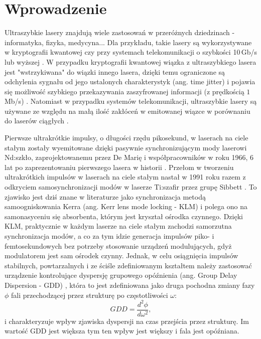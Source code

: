 
\chapter{Wprowadzenie} \label{wstep}

Ultraszybkie lasery znajdują wiele zastosowań w przeróżnych dziedzinach - informatyka, fizyka, medycyna...  Dla przykładu, takie lasery są wykorzystywane w kryptografii kwantowej czy przy systemach telekomunikacji o szybkości 10\,Gb/s lub wyższej \cite{vecsel}. W przypadku kryptografii kwantowej wiązka z ultraszybkiego lasera jest "wstrzykiwana" do wiązki innego lasera, dzięki temu ograniczone są odchylenia sygnału od jego ustalonych charakterystyk (ang. time jitter) i pojawia się możliwość szybkiego przekazywania zaszyfrowanej informacji (z prędkością $1$\,Mb/s) \cite{quant}. Natomiast w przypadku systemów telekomunikacji, ultraszybkie lasery są używane ze względu na małą ilość zakłóceń w emitowanej wiązce w porównaniu do laserów ciągłych \cite{vecsel}.

Pierwsze ultrakrótkie impulsy, o długości rzędu pikosekund, w laserach na ciele stałym zostały wyemitowane dzięki pasywnie synchronizującym mody laserowi Nd:szkło, zaprojektowanemu przez De Marię i współpracowników w roku 1966, 6 lat po zaprezentowaniu pierwszego lasera w historii \cite{hist}. %
Przełom w tworzeniu ultrakrótkich impulsów w laserach na ciele stałym nastał w 1991 roku razem z odkryciem samosynchronizacji modów w laserze Ti:szafir przez grupę Sibbett \cite{hist2}. To zjawisko jest dziś znane w literaturze jako synchronizacja metodą samoogniskowania Kerra (ang. Kerr lens mode locking - KLM) i polega ono na samonasyceniu się absorbenta, którym jest kryształ ośrodka czynnego. Dzięki KLM, praktycznie w każdym laserze na ciele stałym zachodzi samorzutna synchronizacja modów, a co za tym idzie generacja impulsów piko- i femtosekundowych bez potrzeby stosowanie urządzeń modulujących, gdyż modulatorem jest sam ośrodek czynny. Jednak, w celu osiągnięcia impulsów stabilnych, powtarzalnych i ze ściśle zdefiniowanym kształtem należy zastosować urządzenie kontrolujące dyspersję grupowego opóźnienia (ang. Group Delay Dispersion - GDD) \cite{hist3}, która to jest zdefiniowana jako druga pochodna zmiany fazy $\phi$ fali przechodzącej przez strukturę po częstotliwości $\omega$:
\begin{equation}
    GDD = \frac{d^2\phi}{d\omega^2},
\end{equation}
i charakteryzuje wpływ zjawiska dyspersji na czas przejścia przez strukturę. Im wartość GDD jest większa tym ten wpływ jest większy i fala jest opóźniana.

